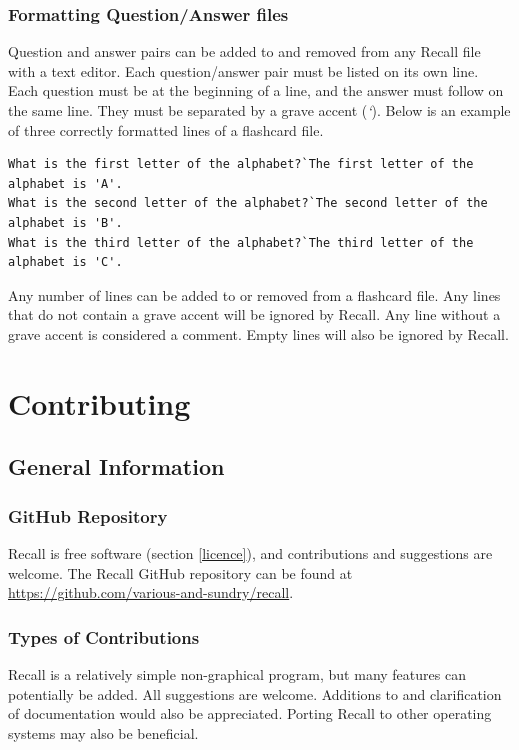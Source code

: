 \documentclass[letterpaper]{article}
\begin{document}
\subsubsection{Formatting Question/Answer files}
Question and answer pairs can be added to and removed from any Recall file with a text editor. Each question/answer pair must be listed on its own line. Each question must be at the beginning of a line, and the answer must follow on the same line. They must be separated by a grave accent (\textit{`}). Below is an example of three correctly formatted lines of a flashcard file.
\begin{verbatim}
What is the first letter of the alphabet?`The first letter of the alphabet is 'A'.
What is the second letter of the alphabet?`The second letter of the alphabet is 'B'.
What is the third letter of the alphabet?`The third letter of the alphabet is 'C'.
\end{verbatim}
Any number of lines can be added to or removed from a flashcard file. Any lines that do not contain a grave accent will be ignored by Recall. Any line without a grave accent is considered a comment. Empty lines will also be ignored by Recall.

\section{Contributing} \label{contributing}
\subsection{General Information}
\subsubsection{GitHub Repository}
Recall is free software (section \ref{licence}), and contributions and suggestions are welcome. The Recall GitHub repository can be found at \href{https://github.com/various-and-sundry/recall}{https://github.com/various-and-sundry/recall}.

\subsubsection{Types of Contributions}
Recall is a relatively simple non-graphical program, but many features can potentially be added. All suggestions are welcome. Additions to and clarification of documentation would also be appreciated. Porting Recall to other operating systems may also be beneficial.
\end{document}

